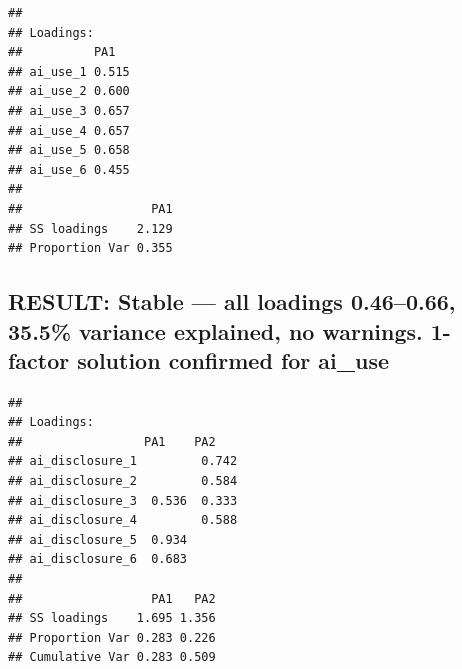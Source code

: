 \documentclass[
]{article}
\newenvironment{Shaded}{\begin{snugshade}}{\end{snugshade}}
\newcommand{\AttributeTok}[1]{\textcolor[rgb]{0.13,0.29,0.53}{#1}}
\newcommand{\CommentTok}[1]{\textcolor[rgb]{0.56,0.35,0.01}{\textit{#1}}}
\newcommand{\DecValTok}[1]{\textcolor[rgb]{0.00,0.00,0.81}{#1}}
\newcommand{\FloatTok}[1]{\textcolor[rgb]{0.00,0.00,0.81}{#1}}
\newcommand{\FunctionTok}[1]{\textcolor[rgb]{0.13,0.29,0.53}{\textbf{#1}}}
\newcommand{\NormalTok}[1]{#1}
\newcommand{\OtherTok}[1]{\textcolor[rgb]{0.56,0.35,0.01}{#1}}
\newcommand{\SpecialCharTok}[1]{\textcolor[rgb]{0.81,0.36,0.00}{\textbf{#1}}}
\newcommand{\StringTok}[1]{\textcolor[rgb]{0.31,0.60,0.02}{#1}}
\begin{document}
\begin{Shaded}
\end{Shaded}

\begin{verbatim}
## 
## Loadings:
##          PA1  
## ai_use_1 0.515
## ai_use_2 0.600
## ai_use_3 0.657
## ai_use_4 0.657
## ai_use_5 0.658
## ai_use_6 0.455
## 
##                  PA1
## SS loadings    2.129
## Proportion Var 0.355
\end{verbatim}

\subsection{RESULT: Stable --- all loadings 0.46--0.66, 35.5\% variance
explained, no warnings. 1-factor solution confirmed for
ai\_use}\label{result-stable-all-loadings-0.460.66-35.5-variance-explained-no-warnings.-1-factor-solution-confirmed-for-ai_use}

\begin{Shaded}
\end{Shaded}

\begin{verbatim}
## 
## Loadings:
##                 PA1    PA2   
## ai_disclosure_1         0.742
## ai_disclosure_2         0.584
## ai_disclosure_3  0.536  0.333
## ai_disclosure_4         0.588
## ai_disclosure_5  0.934       
## ai_disclosure_6  0.683       
## 
##                  PA1   PA2
## SS loadings    1.695 1.356
## Proportion Var 0.283 0.226
## Cumulative Var 0.283 0.509
\end{verbatim}
\end{document}
